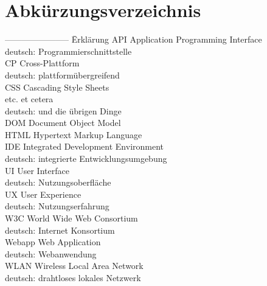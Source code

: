 \documentclass[a4paper]{scrartcl}
\begin{document}
\newpage

\section*{Abkürzungsverzeichnis}


\begin{tabbing}
	----------------------- \= Erklärung \kill
	API \> Application Programming Interface \\
	\> deutsch: Programmierschnittstelle \\
	CP \> Cross-Plattform \\
	\> deutsch: plattformübergreifend \\
	CSS \> Cascading Style Sheets \\
	etc. \> et cetera \\
	\> deutsch: und die übrigen Dinge \\
	DOM \> Document Object Model \\
	HTML \> Hypertext Markup Language \\
	IDE \> Integrated Development Environment \\
	\> deutsch: integrierte Entwicklungsumgebung \\
	UI \> User Interface \\
	\> deutsch: Nutzungsoberfläche \\
	UX \> User Experience \\
	\> deutsch: Nutzungserfahrung \\
	W3C \> World Wide Web Consortium \\
	\> deutsch: Internet Konsortium \\
	Webapp \> Web Application \\
	\> deutsch: Webanwendung \\
	WLAN \> Wireless Local Area Network \\
	\> deutsch: drahtloses lokales Netzwerk \\
	
\end{tabbing}


\newpage

\listoffigures


\newpage

\listoftables
\end{document}
